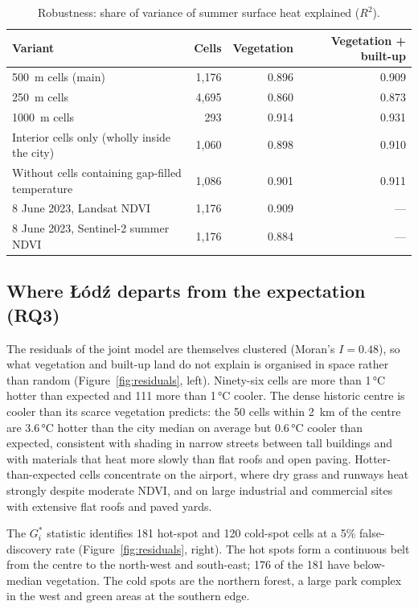 \documentclass[11pt,a4paper]{article}
\begin{document}
\begin{table}[htbp]
\centering
\small
\caption{Robustness: share of variance of summer surface heat explained ($R^2$).}
\label{tab:robust}
\begin{tabular}{lrrr}
\toprule
Variant & Cells & Vegetation & Vegetation + built-up \\
\midrule
500~m cells (main) & 1,176 & 0.896 & 0.909 \\
250~m cells & 4,695 & 0.860 & 0.873 \\
1000~m cells & 293 & 0.914 & 0.931 \\
Interior cells only (wholly inside the city) & 1,060 & 0.898 & 0.910 \\
Without cells containing gap-filled temperature & 1,086 & 0.901 & 0.911 \\
8 June 2023, Landsat NDVI & 1,176 & 0.909 & --- \\
8 June 2023, Sentinel-2 summer NDVI & 1,176 & 0.884 & --- \\
\bottomrule
\end{tabular}
\end{table}

\subsection{Where Łódź departs from the expectation (RQ3)}

The residuals of the joint model are themselves clustered (Moran's $I = 0.48$), so what vegetation and built-up land do not explain is organised in space rather than random (Figure~\ref{fig:residuals}, left). Ninety-six cells are more than 1\,°C hotter than expected and 111 more than 1\,°C cooler. The dense historic centre is cooler than its scarce vegetation predicts: the 50 cells within 2~km of the centre are 3.6\,°C hotter than the city median on average but 0.6\,°C cooler than expected, consistent with shading in narrow streets between tall buildings and with materials that heat more slowly than flat roofs and open paving. Hotter-than-expected cells concentrate on the airport, where dry grass and runways heat strongly despite moderate NDVI, and on large industrial and commercial sites with extensive flat roofs and paved yards.

The $G_i^*$ statistic identifies 181 hot-spot and 120 cold-spot cells at a 5\% false-discovery rate (Figure~\ref{fig:residuals}, right). The hot spots form a continuous belt from the centre to the north-west and south-east; 176 of the 181 have below-median vegetation. The cold spots are the northern forest, a large park complex in the west and green areas at the southern edge.
\end{document}
